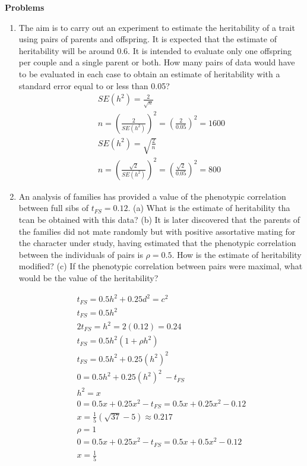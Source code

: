 \documentclass[12pt]{amsart}
\begin{document}
{\large \bf Problems}   
\begin{enumerate}
\item The aim is to carry out an experiment to estimate the heritability of a trait using pairs of parents and offspring. It is expected that the estimate of heritability will be around 0.6. It is intended to evaluate only one offspring per couple and a single parent or both. How many pairs of data would have to be evaluated in each case to obtain an estimate of heritability with a standard error equal to or less than 0.05?
\begin{gather*}
SE(h^2) = \frac{2}{\sqrt{n}} \\
n = (\frac{2}{SE(h^2)})^2 = (\frac{2}{0.05})^2 = 1600\\
SE(h^2) = \sqrt{\frac{2}{n}}\\
n = (\frac{\sqrt{2}}{SE(h^2)})^2 = (\frac{\sqrt{2}}{0.05})^2 = 800
\end{gather*}

\item An analysis of families has provided a value of the phenotypic correlation between full sibs of $t_{FS} = 0.12$. (a) What is the estimate of heritability tha tcan be obtained with this data? (b) It is later discovered that the parents of the families did not mate randomly but with positive assortative mating for the character under study, having estimated that the phenotypic correlation between the individuals of pairs is $\rho = 0.5$. How is the estimate of heritability modified? (c) If the phenotypic correlation between pairs were maximal, what would be the value of the heritability? 

\begin{gather*}
t_{FS} = 0.5h^2 + 0.25d^2 = c^2 \\
t_{FS} = 0.5h^2 \\
2t_{FS} = h^2 = 2(0.12) = 0.24\\
t_{FS} = 0.5h^2(1 + \rho h^2) \\
t_{FS} = 0.5h^2 + 0.25(h^2)^2 \\
0 = 0.5h^2 + 0.25(h^2)^2 \ - t_{FS}\\
h^2 = x\\
0 = 0.5x + 0.25x^2 - t_{FS} = 0.5x + 0.25x^2 - 0.12 \\
x = \frac{1}{5}(\sqrt{37}-5) \approx 0.217\\
\rho = 1\\
0 = 0.5x + 0.25x^2 - t_{FS} = 0.5x + 0.5x^2 - 0.12 \\
x = \frac{1}{5}
\end{gather*}


\end{enumerate}
\end{document}
